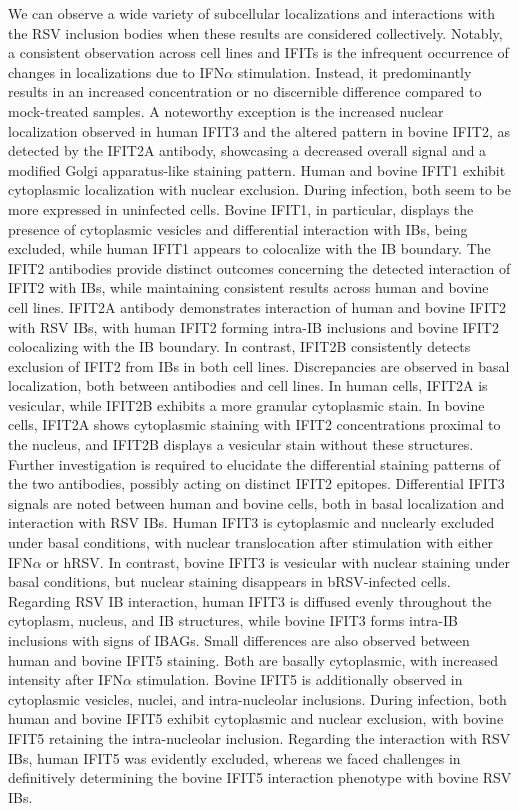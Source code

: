 We can observe a wide variety of subcellular localizations and interactions with the RSV inclusion bodies when these results are considered collectively. Notably, a consistent observation across cell lines and IFITs is the infrequent occurrence of changes in localizations due to IFN\(\alpha\) stimulation. Instead, it predominantly results in an increased concentration or no discernible difference compared to mock-treated samples. A noteworthy exception is the increased nuclear localization observed in human IFIT3 and the altered pattern in bovine IFIT2, as detected by the IFIT2A antibody, showcasing a decreased overall signal and a modified Golgi apparatus-like staining pattern. Human and bovine IFIT1 exhibit cytoplasmic localization with nuclear exclusion. During infection, both seem to be more expressed in uninfected cells. Bovine IFIT1, in particular, displays the presence of cytoplasmic vesicles and differential interaction with IBs, being excluded, while human IFIT1 appears to colocalize with the IB boundary. The IFIT2 antibodies provide distinct outcomes concerning the detected interaction of IFIT2 with IBs, while maintaining consistent results across human and bovine cell lines. IFIT2A antibody demonstrates interaction of human and bovine IFIT2 with RSV IBs, with human IFIT2 forming intra-IB inclusions and bovine IFIT2 colocalizing with the IB boundary. In contrast, IFIT2B consistently detects exclusion of IFIT2 from IBs in both cell lines. Discrepancies are observed in basal localization, both between antibodies and cell lines. In human cells, IFIT2A is vesicular, while IFIT2B exhibits a more granular cytoplasmic stain. In bovine cells, IFIT2A shows cytoplasmic staining with IFIT2 concentrations proximal to the nucleus, and IFIT2B displays a vesicular stain without these structures. Further investigation is required to elucidate the differential staining patterns of the two antibodies, possibly acting on distinct IFIT2 epitopes. Differential IFIT3 signals are noted between human and bovine cells, both in basal localization and interaction with RSV IBs. Human IFIT3 is cytoplasmic and nuclearly excluded under basal conditions, with nuclear translocation after stimulation with either IFN\(\alpha\) or hRSV. In contrast, bovine IFIT3 is vesicular with nuclear staining under basal conditions, but nuclear staining disappears in bRSV-infected cells. Regarding RSV IB interaction, human IFIT3 is diffused evenly throughout the cytoplasm, nucleus, and IB structures, while bovine IFIT3 forms intra-IB inclusions with signs of IBAGs. Small differences are also observed between human and bovine IFIT5 staining. Both are basally cytoplasmic, with increased intensity after IFN\(\alpha\) stimulation. Bovine IFIT5 is additionally observed in cytoplasmic vesicles, nuclei, and intra-nucleolar inclusions. During infection, both human and bovine IFIT5 exhibit cytoplasmic and nuclear exclusion, with bovine IFIT5 retaining the intra-nucleolar inclusion. Regarding the interaction with RSV IBs, human IFIT5 was evidently excluded, whereas we faced challenges in definitively determining the bovine IFIT5 interaction phenotype with bovine RSV IBs.


